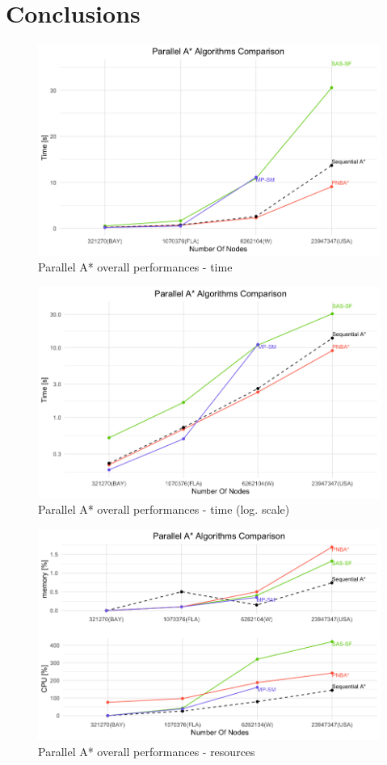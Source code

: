 \documentclass[12pt]{beamer}
\begin{document}
	\section{Conclusions}
	\begin{frame}{\secname}
		\begin{figure}[ht!]
			\centering
			\includegraphics[width=0.85\linewidth]{others/all_algo_time.png}
			\caption{Parallel A* overall performances - time}
		\end{figure}
	\end{frame}
	\begin{frame}{\secname}
		\begin{figure}[ht!]
			\centering
			\includegraphics[width=0.85\linewidth]{others/all_algo_time_log.png}
			\caption{Parallel A* overall performances - time (log. scale)}
		\end{figure}
	\end{frame}
	\begin{frame}{\secname}
		\begin{figure}[ht!]
			\centering
			\includegraphics[width=0.85\linewidth]{others/all_algo_cpumem.png}
			\caption{Parallel A* overall performances - resources}
		\end{figure}
	\end{frame}
\end{document}
